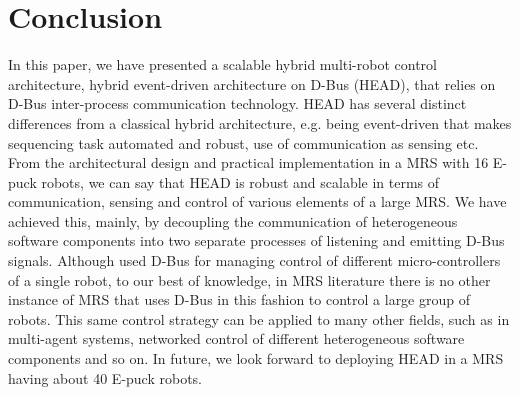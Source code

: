 \documentclass{ifacconf}
\begin{document}
\section{Conclusion}
\label{sec:conc}
In this paper, we have presented a scalable hybrid multi-robot control architecture, hybrid event-driven architecture on D-Bus (HEAD), that relies on D-Bus inter-process communication technology. HEAD has several distinct differences from a classical hybrid architecture, e.g. being event-driven that makes sequencing task automated and robust, use of communication as sensing etc. From the architectural design and practical implementation in a MRS with 16 E-puck robots, we can say that HEAD is robust and scalable in terms of communication, sensing and control of various elements of a large MRS. We have achieved this, mainly, by decoupling the communication of heterogeneous software components into two separate processes of listening and emitting D-Bus signals.
Although \cite{Magnenat+2009} used D-Bus for managing control of different micro-controllers of a single robot, to our best of knowledge, in MRS literature there is no other instance of MRS that uses D-Bus in this fashion to control a large group of robots. This same control strategy can be applied to many other fields, such as in multi-agent systems, networked control of different heterogeneous software components and so on.
In future, we look forward to deploying HEAD in a MRS having about 40 E-puck robots.


                                                   

\end{document}
